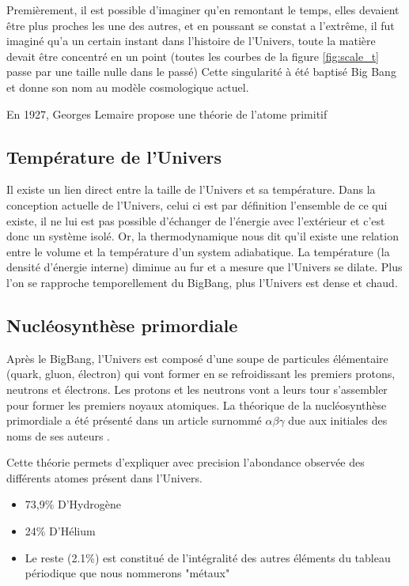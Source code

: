 Premièrement, il est possible d'imaginer qu'en remontant le temps, elles devaient être plus proches les une des autres, et en poussant se constat a l’extrême, il fut imaginé qu'a un certain instant dans l'histoire de l'Univers, toute la matière devait être concentré en un point (toutes les courbes de la figure \ref{fig:scale_t} passe par une taille nulle dans le passé)
Cette singularité à été baptisé Big Bang et donne son nom au modèle cosmologique actuel.

En 1927, Georges Lemaire propose une théorie de l'atome primitif \cite{1927ASSB...47...49L} 


\subsection{Température de l'Univers}

Il existe un lien direct entre la taille de l'Univers et sa température.
Dans la conception actuelle de l'Univers, celui ci est par définition l'ensemble de ce qui existe, il ne lui est pas possible d'échanger de l’énergie avec l’extérieur et c'est donc un système isolé.
Or, la thermodynamique nous dit qu'il existe une relation entre le volume et la température d'un system adiabatique.
La température (la densité d'énergie interne) diminue au fur et a mesure que l'Univers se dilate.
Plus l'on se rapproche temporellement du BigBang, plus l'Univers est dense et chaud.


\subsection{Nucléosynthèse primordiale}
Après le BigBang, l'Univers est composé d'une soupe de particules élémentaire (quark, gluon, électron) qui vont former en se refroidissant les premiers protons, neutrons et électrons.
Les protons et les neutrons vont a leurs tour s'assembler pour former les premiers noyaux atomiques.
La théorique de la nucléosynthèse primordiale a été présenté dans un article surnommé $\alpha \beta \gamma$ due aux initiales des noms de ses auteurs \citep{PhysRev.73.803}.

Cette théorie permets d'expliquer avec precision l'abondance observée des différents atomes présent dans l'Univers.

\begin{itemize}
\item 73,9\% D’Hydrogène
\item 24\% D’Hélium
\item Le reste (2.1\%) est constitué de l'intégralité des autres éléments du tableau périodique que nous nommerons "métaux"
\end{itemize}

